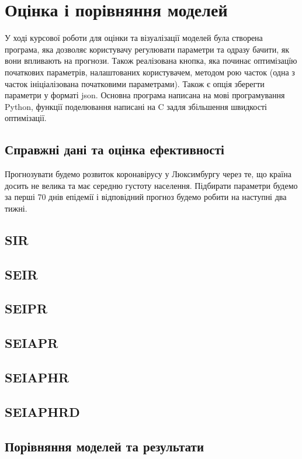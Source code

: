 \chapter{Оцінка і порівняння моделей}


У ході курсової роботи для оцінки та візуалізації моделей була створена 
програма, яка дозволяє користувачу регулювати параметри та одразу бачити, 
як вони впливають на прогнози. Також реалізована кнопка, яка починає 
оптимізацїю початкових параметрів, налаштованих користувачем, методом рою 
часток (одна з часток ініціалізована початковими параметрами). Також 
є опція зберегти параметри у форматі json. 
Основна програма написана на мові програмування Python, функції поделювання 
написані на C задля збільшення швидкості оптимізації.


\section{Справжні дані та оцінка ефективності}

Прогнозувати будемо розвиток коронавірусу у Люксимбургу через те, що країна 
досить не велика та має середню густоту населення. 
Підбирати параметри будемо за перші 70 днів епідемії і відповідний прогноз 
будемо робити на наступні два тижні. 

\section{SIR}
\section{SEIR}
\section{SEIPR}
\section{SEIAPR}
\section{SEIAPHR}
\section{SEIAPHRD}
\section{Порівняння моделей та результати}